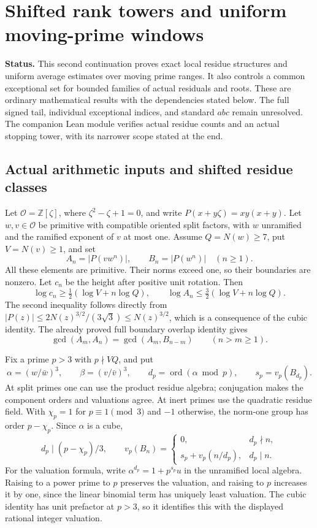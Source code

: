 \section{Shifted rank towers and uniform moving-prime windows}
\label{sec:srw-start}
\noindent\textbf{Status.} This second continuation proves exact local residue
structures and uniform average estimates over moving prime ranges. It also
controls a common exceptional set for bounded families of actual residuals and
roots. These are ordinary mathematical results with the dependencies stated
below. The full signed tail, individual exceptional indices, and standard
$abc$ remain unresolved. The companion Lean module verifies actual residue
counts and an actual stopping tower, with its narrower scope stated at the end.

\subsection{Actual arithmetic inputs and shifted residue classes}
Let $\mathcal O=\mathbb Z[\zeta]$, where $\zeta^2-\zeta+1=0$, and write
$P(x+y\zeta)=xy(x+y)$. Let $w,v\in\mathcal O$ be primitive with compatible
oriented split factors, with $w$ unramified and the ramified exponent of $v$
at most one. Assume $Q=N(w)\ge7$, put $V=N(v)\ge1$, and set
\[
 A_n=|P(vw^n)|,\qquad B_n=|P(w^n)|\quad(n\ge1).
\]
All these elements are primitive. Their norms exceed one, so their boundaries
are nonzero. Let $c_n$ be the height after positive unit rotation. Then
\begin{equation}\label{eq:srw-size}
 \log c_n\ge\tfrac12(\log V+n\log Q),\qquad
 \log A_n\le\tfrac32(\log V+n\log Q).
\end{equation}
The second inequality follows directly from
$|P(z)|\le 2N(z)^{3/2}/(3\sqrt3)\le N(z)^{3/2}$, which is a consequence
of the cubic identity. The already proved full boundary overlap identity gives
\[
 \gcd(A_m,A_n)=\gcd(A_m,B_{n-m})\qquad(n>m\ge1).
\]

Fix a prime $p>3$ with $p\nmid VQ$, and put
\[
 \alpha=(w/\bar w)^3,\qquad \beta=(v/\bar v)^3,\qquad
 d_p=\operatorname{ord}(\alpha\bmod p),\qquad
 s_p=v_p(B_{d_p}).
\]
At split primes one can use the product residue algebra; conjugation makes
the component orders and valuations agree. At inert primes use the quadratic
residue field. With $\chi_p=1$ for $p\equiv1\pmod3$ and $-1$ otherwise,
the norm-one group has order $p-\chi_p$. Since $\alpha$ is a cube,
\begin{equation}\label{eq:srw-step}
 d_p\mid(p-\chi_p)/3,\qquad
 v_p(B_n)=
 \begin{cases}
 0,&d_p\nmid n,\\
 s_p+v_p(n/d_p),&d_p\mid n.
 \end{cases}
\end{equation}
For the valuation formula, write $\alpha^{d_p}=1+p^{s_p}u$ in the
unramified local algebra. Raising to a power prime to $p$ preserves the
valuation, and raising to $p$ increases it by one, since the linear binomial
term has uniquely least valuation. The cubic identity has unit prefactor at
$p>3$, so it identifies this with the displayed rational integer valuation.

